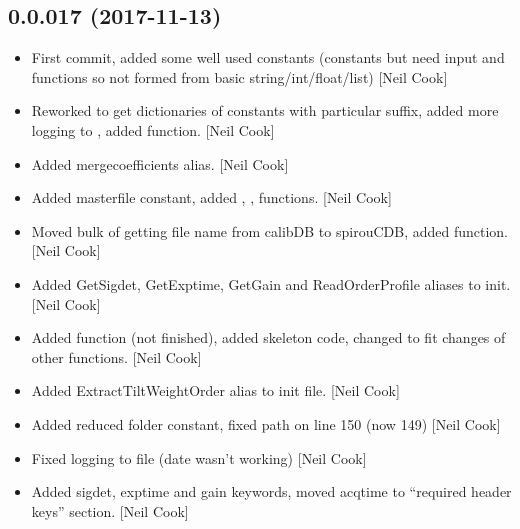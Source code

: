 \documentclass[a4paper,10pt,english]{report}
\begin{document}
\subsection{0.0.017 (2017-11-13)}
\label{\detokenize{misc/changelog:id534}}\begin{itemize}
\item {} 
First commit, added some well used constants (constants but need input
and functions so not formed from basic string/int/float/list) {[}Neil
Cook{]}

\item {} 
Reworked  to get dictionaries of constants with particular
suffix, added more logging to , added
 function. {[}Neil Cook{]}

\item {} 
Added mergecoefficients alias. {[}Neil Cook{]}

\item {} 
Added masterfile constant, added , , 
functions. {[}Neil Cook{]}

\item {} 
Moved bulk of getting file name from calibDB to spirouCDB, added
 function. {[}Neil Cook{]}

\item {} 
Added GetSigdet, GetExptime, GetGain and ReadOrderProfile aliases to
init. {[}Neil Cook{]}

\item {} 
Added  function (not finished), added
 skeleton code, changed  to fit
changes of other functions. {[}Neil Cook{]}

\item {} 
Added ExtractTiltWeightOrder alias to init file. {[}Neil Cook{]}

\item {} 
Added reduced folder constant, fixed  path on line 150 (now
149) {[}Neil Cook{]}

\item {} 
Fixed logging to file (date wasn’t working) {[}Neil Cook{]}

\item {} 
Added sigdet, exptime and gain keywords, moved acqtime to “required
header keys” section. {[}Neil Cook{]}


\end{itemize}
\end{document}
